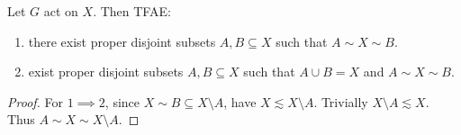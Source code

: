 \documentclass[a4paper]{article}
\begin{document}
\begin{corollary}
  Let \(G\) act on \(X\). Then TFAE:
  \begin{enumerate}
  \item there exist proper disjoint subsets \(A, B \subseteq X\) such that \(A \sim X \sim B\).
  \item exist proper disjoint subsets \(A, B \subseteq X\) such that \(A \cup B = X\) and \(A \sim X \sim B\).
  \end{enumerate}
\end{corollary}

\begin{proof}
  For \(1 \implies 2\), since \(X \sim B \subseteq X \setminus A\), have \(X \lesssim X \setminus A\). Trivially \(X \setminus A \lesssim X\). Thus \(A \sim X \sim X \setminus A\).
\end{proof}





\printindex
\end{document}
